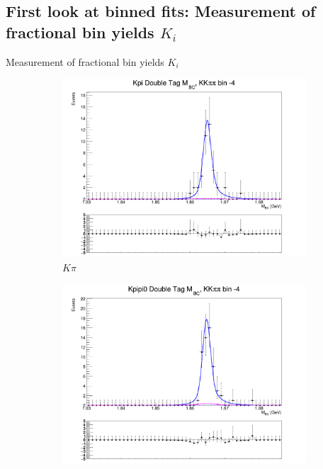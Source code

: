 \documentclass{beamer}
\begin{document}
\subsection{First look at binned fits: Measurement of fractional bin yields \texorpdfstring{$K_i$}{Ki}}

\begin{frame}{Measurement of fractional bin yields $K_i$}
  \begin{figure}
    \centering
    \vspace{-0.2cm}
    \begin{subfigure}{0.35\textwidth}
      \includegraphics[width = 1.0\textwidth]{Plots/DoubleTagYield_DoubleTag_Flavour_KKpipi_vs_Kpi_SignalBinM4_TagBin0.png}
      \caption{$K\pi$}
    \end{subfigure}
    \begin{subfigure}{0.35\textwidth}
      \includegraphics[width = 1.0\textwidth]{Plots/DoubleTagYield_DoubleTag_Flavour_KKpipi_vs_Kpipi0_SignalBinM4_TagBin0.png}

\end{subfigure}
\end{figure}
\end{frame}
\end{document}
